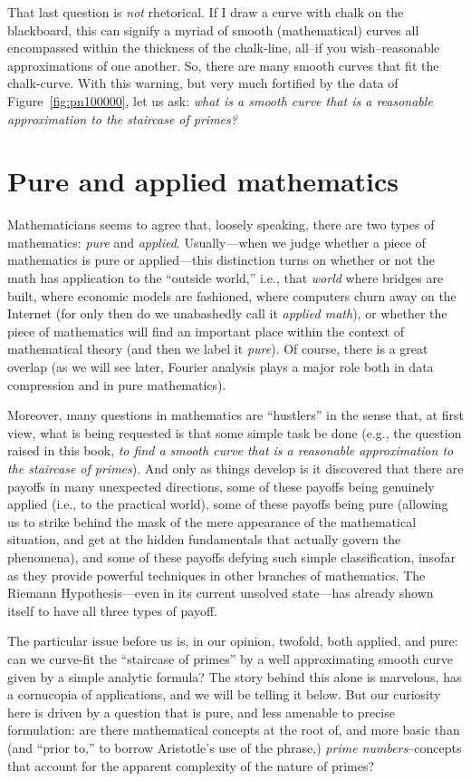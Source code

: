\documentclass[openany]{book}
\theoremstyle{plain}
\theoremstyle{definition}
\newcommand{\RH}{Riemann Hypothesis\index{Riemann Hypothesis}}
\begin{document}
That last question is {\em not} rhetorical. If I draw a curve with
chalk on the blackboard, this can signify a myriad of smooth
(mathematical) curves all encompassed within the thickness of the
chalk-line, all--if you wish--reasonable approximations of one
another. So, there are many smooth curves that fit the chalk-curve.
With this warning, but very much fortified by the data of Figure~\ref{fig:pn100000},
let us ask: {\em what is a smooth curve that is a reasonable
  approximation to the staircase of primes?}

\chapter{Pure and applied  mathematics}\label{ch:pureapplied}

Mathematicians seems to agree that, loosely speaking, there are two
types of mathematics: {\em pure} and {\em applied}. Usually---when we
judge whether a piece of mathematics is pure or applied---this
distinction turns on whether or not the math has application to the
``outside world,'' i.e., that {\em world} where bridges are built,
where economic models are fashioned, where computers churn away on the
Internet (for only then do we unabashedly call it {\em applied math}),
or whether the piece of mathematics will find an important place
within the context of mathematical theory (and then we label it {\em
  pure}).  Of course, there is a great overlap (as we will see later,
Fourier analysis plays a major role both in data compression and in
pure mathematics).

 Moreover, many questions in
mathematics are ``hustlers'' in the sense that, at first view, what is
being requested is that some simple task be done (e.g., the question
raised in this book, {\em to find a smooth curve that is a reasonable
  approximation to the staircase of primes}).  And only as things
develop is it discovered that there are payoffs in many unexpected
directions, some of these payoffs being genuinely applied (i.e., to
the practical world), some of these payoffs being pure (allowing us
to strike behind the mask of the mere appearance of the mathematical
situation, and get at the hidden fundamentals that actually govern the
phenomena), and some of these payoffs defying such simple
classification, insofar as they provide powerful techniques in other
branches of mathematics.  The \RH{}---even in its current
unsolved state---has already shown itself to have all three types of
payoff.

The particular issue before us is, in our opinion, twofold, both
applied, and pure: can we curve-fit the ``staircase of primes'' by a
well approximating smooth curve given by a simple analytic formula?
The story behind this alone is
marvelous, has a cornucopia of applications, and we will be telling it
below. But our curiosity here is driven by a question that is pure,
and less amenable to precise formulation: are there mathematical
concepts at the root of, and more basic than (and ``prior to,'' to
borrow Aristotle's use of the phrase,) {\em prime numbers}--concepts
that account for the apparent complexity of the nature of primes?
\end{document}
